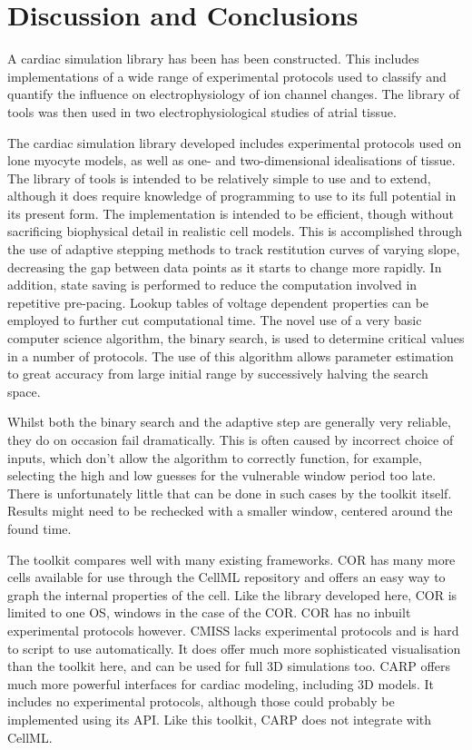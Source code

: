 \section{Discussion and Conclusions}

A cardiac simulation library has been has been constructed.
This includes implementations of a wide range of experimental protocols used to
classify and quantify the influence on electrophysiology of ion channel changes.
The library of tools was then used in two electrophysiological studies of atrial
tissue.

The cardiac simulation library developed includes experimental protocols used on
lone myocyte models, as well as one- and two-dimensional idealisations of
tissue.
The library of tools is intended to be relatively simple to use and to extend,
although it does require knowledge of programming to use to its full potential
in its present form.
The implementation is intended to be efficient, though without sacrificing
biophysical detail in realistic cell models.
This is accomplished through the use of adaptive stepping methods to track
restitution curves of varying slope, decreasing the gap between data points as
it starts to change more rapidly.
In addition, state saving is performed to reduce the computation involved in
repetitive pre-pacing.
Lookup tables of voltage dependent properties can be employed to further cut
computational time.
The novel use of a very basic computer science algorithm, the binary search, is
used to determine critical values in a number of protocols.
The use of this algorithm allows parameter estimation to great accuracy from
large initial range by successively halving the search space.

Whilst both the binary search and the adaptive step are generally very reliable,
they do on occasion fail dramatically.
This is often caused by incorrect choice of inputs, which don't allow the
algorithm to correctly function, for example, selecting the high and low guesses
for the vulnerable window period too late.
There is unfortunately little that can be done in such cases by the toolkit
itself.
Results might need to be rechecked with a smaller window, centered around the
found time.

The toolkit compares well with many existing frameworks.
COR has many more cells available for use through the CellML repository and
offers an easy way to graph the internal properties of the cell.
Like the library developed here, COR is limited to one OS, windows in the case
of the COR.
COR has no inbuilt experimental protocols however.
CMISS lacks experimental protocols and is hard to script to use automatically.
It does offer much more sophisticated visualisation than the toolkit here, and
can be used for full 3D simulations too.
CARP offers much more powerful interfaces for cardiac modeling, including 3D
models.
It includes no experimental protocols, although those could probably be
implemented using its API.
Like this toolkit, CARP does not integrate with CellML.

